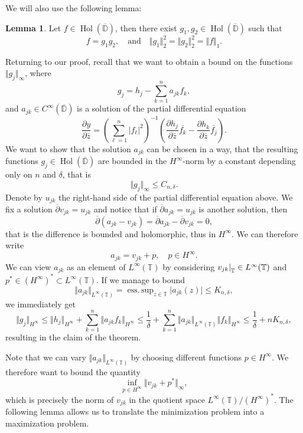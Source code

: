\documentclass[letterpaper, 11pt]{article}
\newcommand{\D}{\mathbb{D}}
\newcommand{\T}{\mathbb{T}}
\newcommand{\1}{\mathds{1}}
\newcommand{\cl}[1]{\overline{#1}}
\newcommand{\restr}[2]{{%
  \left.\kern-\nulldelimiterspace %
  #1 %
  \littletaller %
  \right|_{#2} %
  }}
\newcommand{\littletaller}{\mathchoice{\vphantom{\big|}}{}{}{}}
\newcommand{\Wirtzbar}[1][]{\frac{\partial #1}{\partial \bar{z}}}
\newcommand{\wirtzbar}{\overline{\partial}}
\DeclareMathOperator*{\Hol}{Hol}
\DeclareMathOperator*{\esssup}{ess.\,sup}
\theoremstyle{definition}
\newtheorem{lemma}[theorem]{Lemma}
\newenvironment{innerproof}
 {\renewcommand{\qedsymbol}{}\proof}
 {\endproof}
\begin{document}
We will also use the following lemma:

\begin{lemma} \label{lem:factorisation}
  Let $f \in \Hol(\cl{\D})$, then there exist $g_1, g_2 \in \Hol(\cl{\D})$ such that
  $$ f = g_1 g_2, \quad \textrm{and} \quad \Vert g_1 \Vert_2^2 = \Vert g_2 \Vert_2^2 = \Vert f \Vert_1. $$
\end{lemma}

\begin{innerproof}[Proof (continued)]
  Returning to our proof, recall that we want to obtain a bound on the functions $\Vert g_j \Vert_\infty$, where
  $$ g_j = h_j - \sum_{k=1}^n a_{jk} f_k, $$
  and $a_{jk} \in C^\infty(\cl{\D})$ is a solution of the partial differential equation
  $$ \Wirtzbar[y] = \left( \sum_{\ell=1}^n \vert f_\ell \vert^2 \right)^{-1} \left( \Wirtzbar[h_j] \bar{f_k} - \Wirtzbar[h_k] \bar{f_j} \right). $$
  We want to show that the solution $a_{jk}$ can be chosen in a way, that the resulting functions $g_j \in \Hol(\cl{\D})$ are bounded in the $H^\infty$-norm by a constant depending only on $n$ and $\delta$, that is
  $$ \Vert g_j \Vert_\infty \leq C_{n, \delta}. $$
  Denote by $u_{jk}$ the right-hand side of the partial differential equation above. We fix a solution $\wirtzbar v_{jk} = u_{jk}$ and notice that if $\wirtzbar a_{jk} = u_{jk}$ is another solution, then
  $$ \wirtzbar (a_{jk} - v_{jk}) = \wirtzbar a_{jk} - \wirtzbar v_{jk} = 0, $$
  that is the difference is bounded and holomorphic, thus in $H^\infty$. We can therefore write
  $$ a_{jk} = v_{jk} + p, \quad p \in H^\infty. $$
  We can view $a_{jk}$ as an element of $L^\infty(\T)$ by considering $\restr{v_{jk}}{\T} \in L^\infty(\T)$ and $p^* \in (H^\infty)^* \subset L^\infty(\T)$. If we manage to bound
  $$ \Vert a_{jk} \Vert_{L^\infty(\T)} = \esssup_{z \in \T} \vert a_{jk}(z) \vert \leq K_{n,\delta}, $$
  we immediately get
  $$ \Vert g_j \Vert_{H^\infty} \leq \Vert h_j \Vert_{H^\infty} + \sum_{k=1}^n \Vert a_{jk} f_k \Vert_{H^\infty} \leq \frac{1}{\delta} + \sum_{k=1}^n \Vert a_{jk} \Vert_{L^\infty(\T)} \Vert f_k \Vert_{H^\infty} \leq \frac{1}{\delta} + n K_{n, \delta}, $$
  resulting in the claim of the theorem.

  Note that we can vary $\Vert a_{jk} \Vert_{L^\infty(\T)}$ by choosing different functions $p \in H^\infty$. We therefore want to bound the quantity
  $$ \inf_{p \in H^\infty} \Vert v_{jk} + p^* \Vert_\infty, $$
  which is precisely the norm of $v_{jk}$ in the quotient space $L^\infty(\T) / (H^\infty)^*$. The following lemma allows us to translate the minimization problem into a maximization problem.
\end{innerproof}
\end{document}
